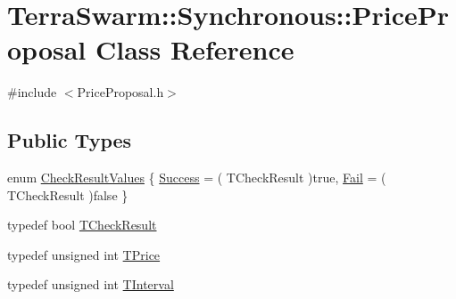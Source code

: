 \hypertarget{class_terra_swarm_1_1_synchronous_1_1_price_proposal}{\section{Terra\-Swarm\-:\-:Synchronous\-:\-:Price\-Proposal Class Reference}
\label{class_terra_swarm_1_1_synchronous_1_1_price_proposal}
}


{\ttfamily \#include $<$Price\-Proposal.\-h$>$}

\subsection*{Public Types}
\begin{DoxyCompactItemize}
\item 
enum \hyperlink{class_terra_swarm_1_1_synchronous_1_1_price_proposal_afd8478709e56657c81455a26ce72ccf5}{Check\-Result\-Values} \{ \hyperlink{class_terra_swarm_1_1_synchronous_1_1_price_proposal_afd8478709e56657c81455a26ce72ccf5ac810ff36c431d78082d6734fe1f78025}{Success} = ( T\-Check\-Result )true, 
\hyperlink{class_terra_swarm_1_1_synchronous_1_1_price_proposal_afd8478709e56657c81455a26ce72ccf5a3ab8a257a8c21581a5377bf17c20e1cd}{Fail} = ( T\-Check\-Result )false
 \}
\item 
typedef bool \hyperlink{class_terra_swarm_1_1_synchronous_1_1_price_proposal_ab5aef6a74a44439eb880f7dbff610b57}{T\-Check\-Result}
\item 
typedef unsigned int \hyperlink{class_terra_swarm_1_1_synchronous_1_1_price_proposal_a663093d390a30942a07eee3681ff8fe2}{T\-Price}
\item 
typedef unsigned int \hyperlink{class_terra_swarm_1_1_synchronous_1_1_price_proposal_a37e6344d030c7695bb9cb341648928ee}{T\-Interval}
\end{DoxyCompactItemize}
